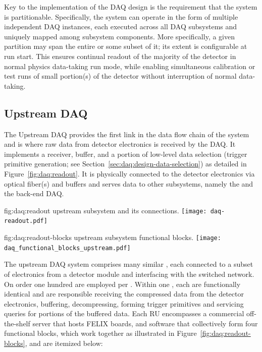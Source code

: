 Key to the implementation of the DAQ design is the requirement that the system
is partitionable.
Specifically, the system can operate in the form of multiple independent DAQ
instances, each executed across all DAQ subsystems and uniquely mapped among
subsystem components. 
More specifically, a given partition may span the entire  or
some subset of it; its extent is configurable at run start.
This ensures continual readout of the majority of the detector in normal physics
data-taking run mode, while enabling simultaneous calibration or test runs of
small portion(s) of the detector without interruption of normal data-taking. 

\subsection{Upstream DAQ}
\label{sec:daq:design-upstream}

The Upstream DAQ provides the first link in the data flow chain of the
 system and is where raw data from detector electronics is received
by the DAQ.
It implements a receiver, buffer, and a portion of low-level data selection
(trigger primitive generation; see Section~\ref{sec:daq:design-data-selection})
as detailed in Figure~\ref{fig:daq:readout}.
It is physically connected to the detector electronics via optical fiber(s) and
buffers and serves data to other  subsystems, namely the
 and the back-end DAQ.

\begin{dunefigure}{fig:daq:readout}{ upstream  subsystem and its connections.}
  \texttt{[image: daq-readout.pdf]}
\end{dunefigure}

\begin{dunefigure}{fig:daq:readout-blocks}{ upstream
     subsystem functional blocks.}
  \texttt{[image: daq\_functional\_blocks\_upstream.pdf]}
\end{dunefigure}

The upstream DAQ system comprises many similar , each connected to
a subset of electronics from a detector module and interfacing with the
 switched network. 
On order one hundred  are employed per .
Within one , each are functionally identical and are
responsible receiving the compressed data from the detector electronics,
buffering, decompressing, forming trigger primitives and servicing queries for
portions of the buffered data.
Each RU encompasses a commercial off-the-shelf server that hosts FELIX boards,
and software that collectively form four functional blocks, which work together
as illustrated in Figure~\ref{fig:daq:readout-blocks}, and are itemized below:

